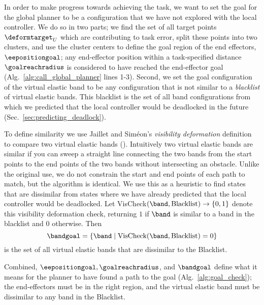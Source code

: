 In order to make progress towards achieving the task, we want to set the goal for the global planner to be a configuration that we have not explored with the local controller. We do so in two parts; we find the set of all target points $\deformtarget_U$ which are contributing to task error, split these points into two clusters, and use the cluster centers to define the goal region of the end effectors, $\eepositiongoal$; any end-effector position within a task-specified distance $\goalreachradius$ is considered to have reached the end-effector goal (Alg.~\ref{alg:call_global_planner} lines 1-3). Second, we set the goal configuration of the virtual elastic band to be any configuration that is not similar to a \textit{blacklist} of virtual elastic bands. This blacklist is the set of all band configurations from which we predicted that the local controller would be deadlocked in the future (Sec.~\ref{sec:predicting_deadlock}).


To define similarity we use Jaillet and Sim\'{e}on's \textit{visibility deformation} definition to compare two virtual elastic bands (\cite{Jaillet2008}). Intuitively two virtual elastic bands are similar if you can sweep a straight line connecting the two bands from the start points to the end points of the two bands without intersecting an obstacle. Unlike the original use, we do not constrain the start and end points of each path to match, but the algorithm is identical. We use this as a heuristic to find states that are dissimilar from states where we have already predicted that the local controller would be deadlocked. Let VisCheck$(\band,\textrm{Blacklist}) \rightarrow \{0, 1\}$ denote this visibility deformation check, returning $1$ if $\band$ is similar to a band in the blacklist and $0$ otherwise. Then
\begin{equation}
    \bandgoal = \{\band \mid \text{VisCheck}(\band, \textrm{Blacklist}) = 0\}
    \label{eqn:bandgoal}
\end{equation}
is the set of all virtual elastic bands that are dissimilar to the Blacklist.

Combined, $\eepositiongoal, \goalreachradius$, and $\bandgoal$ define what it means for the planner to have found a path to the goal (Alg.~\ref{alg:goal_check}); the end-effectors must be in the right region, and the virtual elastic band must be dissimilar to any band in the Blacklist.%




